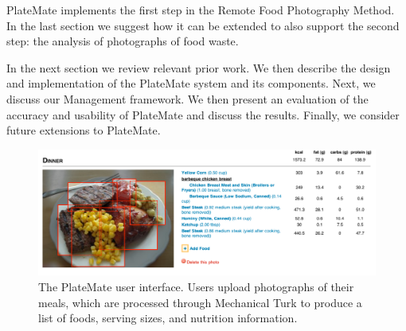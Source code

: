 
PlateMate implements the first step in the Remote Food Photography Method.  In the last section we suggest how it can be extended to also support the second step: the analysis of photographs of food waste.
 
In the next section we review relevant prior work.  We then describe
the design and implementation of the PlateMate system and its
components. Next, we discuss our Management framework.
We then present an evaluation of the accuracy and usability of
PlateMate and discuss the results. Finally, we consider future
extensions to PlateMate.

\begin{figure}[t]
\begin{center}
   \includegraphics[width=\linewidth]{figs/ui-withHeaders.pdf}
   \caption{The PlateMate user interface.  Users upload photographs of their meals, which are processed through Mechanical Turk to produce a list of foods, serving sizes, and nutrition information.}
   \label{fig:ui}
\end{center}
\end{figure}
